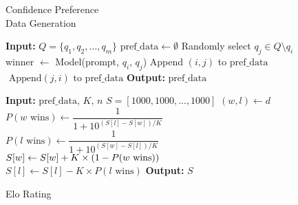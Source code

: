 \begin{figure*}[t]
    \centering
    \begin{minipage}{0.45\textwidth}
        \centering
        \begin{algorithm}[H]
        \caption{Confidence Preference \\ Data Generation}
        \label{alg:conf_pref_data}
        \begin{algorithmic}[1]
        \State \textbf{Input:} $Q = \{q_1, q_2, \dots, q_m\}$
        \State $\text{pref\_data} \gets \emptyset$
                \State Randomly select $q_j \in Q \setminus q_i$
                \State winner $\gets$ Model(prompt, $q_i$, $q_j$)
                    Append $(i, j)$ to $\text{pref\_data}$
                \Else $\text{ Append} (j, i)  \text{ to pref\_data}$
                \EndIf
            \EndFor
        \EndFor
        \State \textbf{Output:} $\text{pref\_data}$
        \end{algorithmic}
        \end{algorithm}
    \end{minipage}\hfill
    \begin{minipage}{0.5\textwidth}
        \centering
        \begin{algorithm}[H]
        \caption{Elo Rating}
        \label{alg:elo_scoring}
        \begin{algorithmic}[1]
        \State \textbf{Input:} $\text{pref\_data}$, $K$, $n$
        \State $S = [1000, 1000, ..., 1000]$
                \State $(w, l) \gets d$
                \State $P(w \text{ wins}) \gets \dfrac{1}{1 + 10^{(S[l] - S[w])/K}}$
                \State $P(l \text{ wins}) \gets \dfrac{1}{1 + 10^{(S[w] - S[l])/K}}$
                \State $S[w] \gets S[w] + K \times (1 - P(w \text{ wins}))\hfill$
                \State $S[l] \gets S[l] - K \times P(l \text{ wins})$
            \EndFor
        \EndFor
        \State \textbf{Output:} $S$
        \end{algorithmic}
        \end{algorithm}
    \end{minipage}
    
\end{figure*}